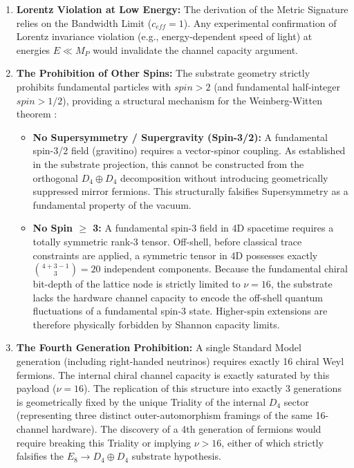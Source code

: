 \begin{enumerate}    
    \item \textbf{Lorentz Violation at Low Energy:} The derivation of the Metric Signature relies on the Bandwidth Limit ($c_{eff}=1$). Any experimental confirmation of Lorentz invariance violation (e.g., energy-dependent speed of light) at energies $E \ll M_P$ would invalidate the channel capacity argument.

    \item \textbf{The Prohibition of Other Spins:} The substrate geometry strictly prohibits fundamental particles with $spin > 2$ (and fundamental half-integer $spin > 1/2$), providing a structural mechanism for the Weinberg-Witten theorem \cite{loebbert_weinberg-witten_2008}:
    \begin{itemize}
        \item \textbf{No Supersymmetry / Supergravity (Spin-3/2):} A fundamental spin-3/2 field (gravitino) requires a vector-spinor coupling. As established in the substrate projection, this cannot be constructed from the orthogonal $D_4 \oplus D_4$ decomposition without introducing geometrically suppressed mirror fermions. This structurally falsifies Supersymmetry as a fundamental property of the vacuum.
        \item \textbf{No Spin $\ge$ 3:} A fundamental spin-3 field in 4D spacetime requires a totally symmetric rank-3 tensor. Off-shell, before classical trace constraints are applied, a symmetric tensor in 4D possesses exactly $\binom{4+3-1}{3} = 20$ independent components. Because the fundamental chiral bit-depth of the lattice node is strictly limited to $\nu=16$, the substrate lacks the hardware channel capacity to encode the off-shell quantum fluctuations of a fundamental spin-3 state. Higher-spin extensions are therefore physically forbidden by Shannon capacity limits.
    \end{itemize}
    
    \item \textbf{The Fourth Generation Prohibition:} A single Standard Model generation (including right-handed neutrinos) requires exactly 16 chiral Weyl fermions. The internal chiral channel capacity is exactly saturated by this payload ($\nu=16$). The replication of this structure into exactly 3 generations is geometrically fixed by the unique Triality of the internal $D_4$ sector (representing three distinct outer-automorphism framings of the same 16-channel hardware). The discovery of a 4th generation of fermions would require breaking this Triality or implying $\nu > 16$, either of which strictly falsifies the $E_8 \to D_4 \oplus D_4$ substrate hypothesis.
    

\end{enumerate}

